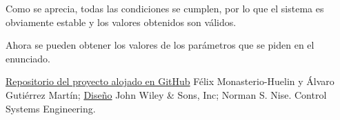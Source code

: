 \documentclass[a4paper]{article}
\begin{document}
Como se aprecia, todas las condiciones se cumplen, por lo que el sistema es obviamente estable y los valores obtenidos son válidos.

Ahora se pueden obtener los valores de los parámetros que se piden en el enunciado.




\begin{thebibliography}{9}
 \href{https://github.com/avicarioe/telelabo}{Repositorio del proyecto alojado en GitHub}
 Félix Monasterio-Huelin y Álvaro Gutiérrez Martín;
\href{http://www.robolabo.etsit.upm.es/asignaturas/seco/apuntes/design.pdf}{Diseño}
 John Wiley \& Sons, Inc; Norman S. Nise. Control Systems Engineering.


\end{thebibliography}
\end{document}
